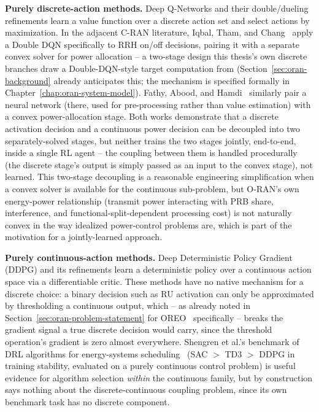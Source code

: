 \textbf{Purely discrete-action methods.} Deep Q-Networks and their
double/dueling refinements learn a value function over a discrete action
set and select actions by maximization. In the adjacent C-RAN literature,
Iqbal, Tham, and Chang~\cite{iqbal2021ddqn} apply a Double DQN specifically
to RRH on/off decisions, pairing it with a separate convex solver for power
allocation -- a two-stage design this thesis's own discrete branches draw a
Double-DQN-style target computation from (Section~\ref{sec:oran-background}
already anticipates this; the mechanism is specified formally in
Chapter~\ref{chap:oran-system-model}). Fathy, Abood, and
Hamdi~\cite{fathy2021ann} similarly pair a neural network (there, used for
pre-processing rather than value estimation) with a convex power-allocation
stage. Both works demonstrate that a discrete activation decision and a
continuous power decision can be decoupled into two separately-solved
stages, but neither trains the two stages jointly, end-to-end, inside a
single RL agent -- the coupling between them is handled procedurally
(the discrete stage's output is simply passed as an input to the convex
stage), not learned. This two-stage decoupling is a reasonable engineering
simplification when a convex solver is available for the continuous
sub-problem, but O-RAN's own energy-power relationship (transmit power
interacting with PRB share, interference, and functional-split-dependent
processing cost) is not naturally convex in the way idealized power-control
problems are, which is part of the motivation for a jointly-learned
approach.

\textbf{Purely continuous-action methods.} Deep Deterministic Policy
Gradient (DDPG) and its refinements learn a deterministic policy over a
continuous action space via a differentiable critic. These methods have no
native mechanism for a discrete choice: a binary decision such as RU
activation can only be approximated by thresholding a continuous output,
which -- as already noted in Section~\ref{sec:oran-problem-statement} for
OREO~\cite{qazzaz2026oreo} specifically -- breaks the gradient signal a true
discrete decision would carry, since the threshold operation's gradient is
zero almost everywhere. Shengren et al.'s benchmark of DRL algorithms for
energy-systems scheduling~\cite{shengren2022benchmark} (SAC $>$ TD3 $>$
DDPG in training stability, evaluated on a purely continuous control
problem) is useful evidence for algorithm selection \emph{within} the
continuous family, but by construction says nothing about the
discrete-continuous coupling problem, since its own benchmark task has no
discrete component.

